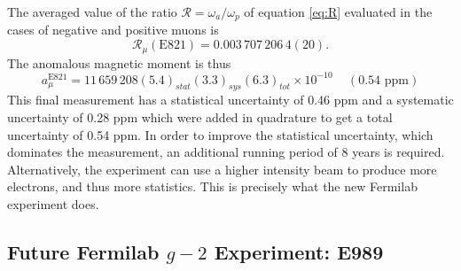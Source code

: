 \documentclass{outhesis}
\begin{document}
The averaged value of the ratio $\mathcal{R} = \omega_a/\omega_p$ of equation \ref{eq:R} evaluated in the cases of negative and positive muons is
\begin{equation}
\mathcal{R}_{\mu}\left(\text{E821}\right) = 0.003\,707\,206\,4(20).
\end{equation}
The anomalous magnetic moment is thus 
\begin{equation}
a_{\mu}^{\text{E821}} = 11\, 659\, 208  \left(5.4\right)_{stat}  \left(3.3\right)_{sys}  \left(6.3\right)_{tot} \times 10^{-10} \,\,\,\,\,\,\, \left(0.54  \text{ ppm}\right)
\end{equation}
This final measurement has a statistical uncertainty of 0.46 ppm and a systematic uncertainty of 0.28 ppm which were added in quadrature to get a total uncertainty of 0.54 ppm. In order to improve the statistical uncertainty, which dominates the measurement, an additional running period of 8 years is required. Alternatively, the experiment can use a higher intensity beam to produce more electrons, and thus more statistics. This is precisely what the new Fermilab experiment does.

\subsection{Future Fermilab $g-2$ Experiment: E989}
\end{document}
